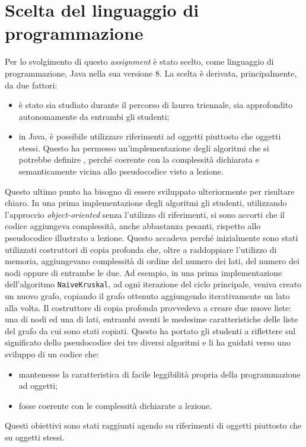 \section{Scelta del linguaggio di programmazione}
Per lo svolgimento di questo \emph{assignment} è stato scelto, come linguaggio di programmazione, Java nella sua versione 8. La scelta è derivata, principalmente, da due fattori: 
\begin{itemize}
	\item è stato sia studiato durante il percorso di laurea triennale, sia approfondito autonomamente da entrambi gli studenti;
	\item in Java, è possibile utilizzare riferimenti ad oggetti piuttosto che oggetti stessi. Questo ha permesso un'implementazione degli algoritmi che si potrebbe definire , perché coerente con la complessità dichiarata e semanticamente vicina allo pseudocodice visto a lezione. 
\end{itemize}
Questo ultimo punto ha bisogno di essere sviluppato ulteriormente per risultare chiaro. In una prima implementazione degli algoritmi gli studenti, utilizzando l'approccio \textit{object-oriented} senza l'utilizzo di riferimenti, si sono accorti che il codice aggiungeva complessità, anche abbastanza pesanti, rispetto allo pseudocodice illustrato a lezione. Questo accadeva perché inizialmente sono stati utilizzati costruttori di copia profonda che, oltre a raddoppiare l'utilizzo di memoria, aggiungevano complessità di ordine del numero dei lati, del numero dei nodi oppure di entrambe le due. \eqcapo
Ad esempio, in una prima implementazione dell'algoritmo \texttt{NaiveKruskal}, ad ogni iterazione del ciclo principale, veniva creato un nuovo grafo, copiando il grafo ottenuto aggiungendo iterativamente un lato alla volta. Il costruttore di copia profonda provvedeva a creare due nuove liste: una di nodi ed una di lati, entrambi aventi le medesime caratteristiche delle liste del grafo da cui sono stati copiati.\eqcapo
 Questo ha portato gli studenti a riflettere sul significato dello pseudocodice dei tre diversi algoritmi e li ha guidati verso uno sviluppo di un codice che:
 \begin{itemize}
 	\item mantenesse la caratteristica di facile leggibilità propria della programmazione ad oggetti;
	\item fosse coerente con le complessità dichiarate a lezione.
 \end{itemize}
Questi obiettivi sono stati raggiunti agendo su riferimenti di oggetti piuttosto che su oggetti stessi.

